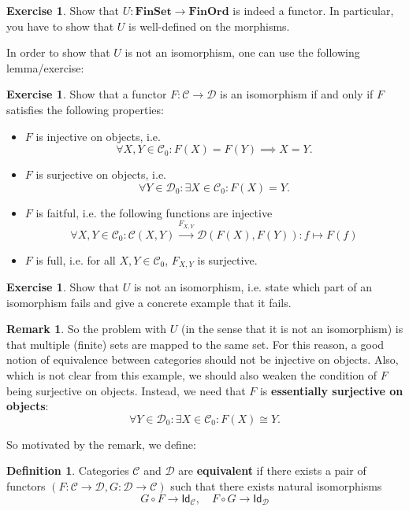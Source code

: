 \documentclass[a4paper,10pt]{scrartcl}
\theoremstyle{plain}
\theoremstyle{definition}
\newtheorem{rem}[thm]{Remark}
\newtheorem{dfn}[thm]{Definition}
\newtheorem{exer}[thm]{Exercise}
\newcommand{\cfont}[1]{\ensuremath{\mathsf{#1}}}
\newcommand{\Cat}[1]{\mathcal{#1}}
\newcommand{\CC}{\Cat{C}}
\newcommand{\DD}{\Cat{D}}
\newcommand{\Catb}[1]{\mathbf{#1}}
\newcommand{\FINSET}{\Catb{FinSet}}
\newcommand{\Ob}[1]{{#1}_0}
\newcommand{\CHom}[3]{{#1}(#2,#3)}
\newcommand{\Id}[1][]{\cfont{Id}_{#1}}
\newcommand{\co}[2]{\ensuremath{#2 \circ #1}}
\begin{document}
\begin{exer} Show that $U: \FINSET\to \Catb{FinOrd}$ is indeed a functor. In particular, you have to show that $U$ is well-defined on the morphisms.
\end{exer}

In order to show that $U$ is not an isomorphism, one can use the following lemma/exercise:
\begin{exer} Show that a functor $F:\CC\to\DD$ is an isomorphism if and only if $F$ satisfies the following properties:
\begin{itemize}
\item $F$ is injective on objects, i.e. 
\[
\forall X,Y\in\Ob{\CC}: F(X) = F(Y) \implies X=Y.
\]
\item $F$ is surjective on objects, i.e. 
\[
\forall Y\in\Ob{\DD}: \exists X\in\Ob{\CC} : F(X) = Y.
\]
\item $F$ is faitful, i.e. the following functions are injective
\[
\forall X,Y\in\Ob{\CC}: \CHom{\CC}{X}{Y} \xrightarrow{F_{X,Y}} \CHom{\DD}{F(X)}{F(Y)} : f\mapsto F(f)
\]
\item $F$ is full, i.e. for all $X,Y\in \Ob{\CC}$, $F_{X,Y}$ is surjective.
\end{itemize}
\end{exer}

\begin{exer} Show that $U$ is not an isomorphism, i.e. state which part of an isomorphism fails and give a concrete example that it fails.
\end{exer}

\begin{rem} So the problem with $U$ (in the sense that it is not an isomorphism) is that multiple (finite) sets are mapped to the same set. For this reason, a good notion of equivalence between categories should not be injective on objects. Also, which is not clear from this example, we should also weaken the condition of $F$ being surjective on objects. Instead, we need that $F$ is \textbf{essentially surjective on objects}:
\[
\forall Y\in\Ob{\DD}: \exists X\in\Ob{\CC} : F(X) \cong Y.
\]
\end{rem}
So motivated by the remark, we define:
\begin{dfn} Categories $\CC$ and $\DD$ are \textbf{equivalent} if there exists a pair of functors $(F:\CC\to\DD, G:\DD\to\CC)$ such that there exists natural isomorphisms 
\[
\co{F}{G} \to \Id[\CC], \quad \co{G}{F} \to \Id[\DD]
\]
\end{dfn}
\end{document}

